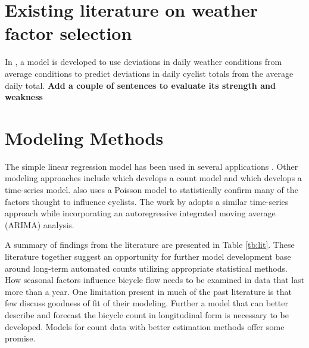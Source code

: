 \documentclass [11pt, proquest] {uwthesis}[2015/03/03]
\begin{document}
\section{Existing literature on weather factor selection}
In \cite{Nosal14}, a model is developed to use deviations in daily weather conditions from average conditions to predict deviations in daily cyclist totals from the average daily total. \textbf{Add a couple of sentences to evaluate its strength and weakness}

\section{Modeling Methods}

The simple linear regression model has been used in several applications \cite{Jones:2008aa,Jones:2010aa}. Other modeling approaches include \cite{Miranda-Moreno:2011aa} which develops a count model and \cite{Thomas:2009aa} which develops a time-series model. \cite{Niemeier:1996aa} also uses a Poisson model to statistically confirm  many of the factors thought to influence cyclists. The work by \cite{Gallop:2012aa} adopts a similar time-series approach while incorporating an autoregressive integrated moving average (ARIMA) analysis. 


A summary of findings from the literature are presented in Table \ref{tb:lit}. These literature together suggest an opportunity for further model development base around long-term automated counts utilizing appropriate statistical methods. How seasonal factors influence bicycle flow needs to be examined in data that last more than a year. One limitation present in much of the past literature is that few discuss goodness of fit of their modeling. Further a model that can better describe and forecast the bicycle count in longitudinal form is necessary to be developed. Models for count data with better estimation methods offer some promise. 
\end{document}
